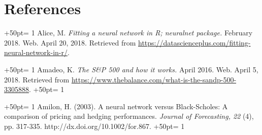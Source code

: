 \newpage
\section*{References}
\hangindent+50pt\hangafter = 1
Alice, M. \textit{Fitting a neural network in R; neuralnet package.} February 2018. Web. April 20, 2018. Retrieved from \url{https://datascienceplus.com/fitting-neural-network-in-r/}.

\hangindent+50pt\hangafter = 1
Amadeo, K. \textit{The S\&P 500 and how it works.} April 2016. Web. April 5, 2018. Retrieved from \url{https://www.thebalance.com/what-is-the-sandp-500-3305888}.
\hangindent+50pt\hangafter = 1

\hangindent+50pt\hangafter = 1
Amilon, H. (2003). A neural network versus Black-Scholes: A comparison of pricing and hedging performances. \textit{Journal of Forecasting, 22} (4), pp. 317-335. http://dx.doi.org/10.1002/for.867.
\hangindent+50pt\hangafter = 1
